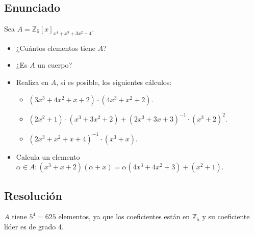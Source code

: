 \section{}\label{ej-1-5}

\subsection*{Enunciado}

Sea $A = \mathbb{Z}_5{[x]}_{x^4 + x^3 + 3x^2 + 4}$.

\begin{itemize}
	\item
		¿Cuántos elementos tiene $A$?
	\item
		¿Es $A$ un cuerpo?
	\item
		Realiza en $A$, si es posible, los siguientes cálculos:
		\begin{itemize}
			\item
				$(3x^3 + 4x^2 + x + 2) \cdot (4x^3 + x^2 + 2)$.
			\item
				$(2x^2 + 1) \cdot (x^3 + 3x^2 + 2) + (2x^3 + 3x + 3)^{-1} \cdot (x^3 + 2)^2$.
			\item
				$(2x^3 + x^2 + x + 4)^{-1} \cdot (x^3 + x)$.
		\end{itemize}
	\item
		Calcula un elemento $\alpha \in A : (x^3 + x + 2)(\alpha + x) = \alpha(4x^3 + 4x^2 + 3) + (x^2 + 1)$.
\end{itemize}

\subsection*{Resolución}

$A$ tiene $5^4 = 625$ elementos, ya que los coeficientes están en $\mathbb{Z}_5$ y su coeficiente líder es de grado 4.
